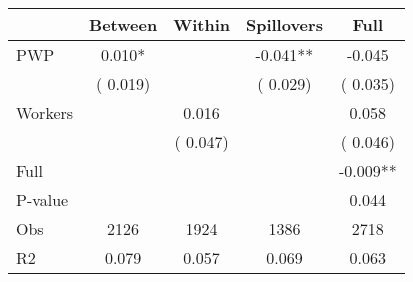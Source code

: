 
\begin{tabular}{l*{4}{c}}\hline&\multicolumn{1}{c}{Between}&\multicolumn{1}{c}{Within}&\multicolumn{1}{c}{Spillovers}&\multicolumn{1}{c}{Full}\\ \hline
 PWP           &              0.010*      &                                               &       -0.041** &        -0.045                            \\ 
                               &        (       0.019)           &                                       &       (       0.029)     &      (       0.035)                                           \\ 
 Workers       &                                               &        0.016    &                                &             0.058                            \\ 
                               &                                               & (       0.047)                  &                                        &      (       0.046)                                           \\ 
\hline                                                                                                                                                                                                                                            
 Full                  &                                               &                                               &                                        &            -0.009**                                     \\ 
 P-value               &                                               &                                               &                                        &             0.044                                           \\ 
 Obs                   &               2126               &       1924                       &       1386                &              2718                                               \\ 
 R2                    &                      0.079              &              0.057                      &              0.069               &                     0.063                                              \\ 
\hline \end{tabular}                                                                                                                                                                                                              